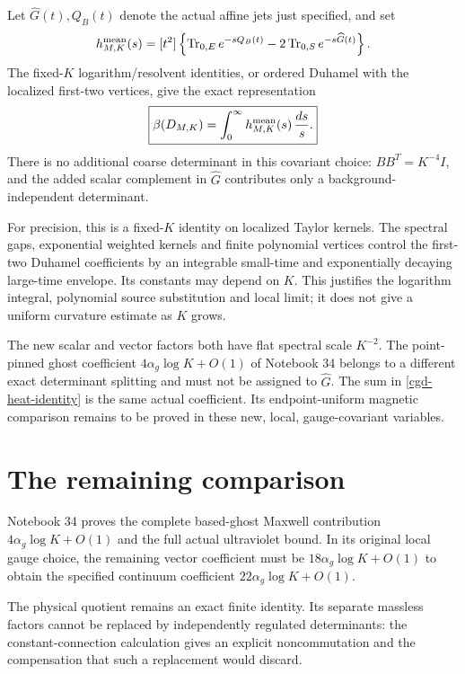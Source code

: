 \documentclass[11pt]{article}
\theoremstyle{remark}
\begin{document}
Let \(\widehat G(t),Q_B(t)\) denote the actual affine
jets just specified, and set
\begin{equation}
 h^{\rm mean}_{M,K}(s)
  =[t^2]\left\{
    \operatorname{Tr}_{0,E}e^{-sQ_B(t)}
             -2\operatorname{Tr}_{0,S}e^{-s\widehat G(t)}
         \right\}.
 \label{cgd-heat-coefficient}
\end{equation}
The fixed-\(K\) logarithm/resolvent identities, or
ordered Duhamel with the localized first-two vertices,
give the exact representation
\begin{equation}
 \boxed{\displaystyle
     \beta(D_{M,K})=
        \int_0^\infty h^{\rm mean}_{M,K}(s)\,\frac{ds}{s}.}
 \label{cgd-heat-identity}
\end{equation}
There is no additional coarse determinant in this
covariant choice: \(BB^T=K^{-4}I\), and the added
scalar complement in \(\widehat G\) contributes only
a background-independent determinant.

For precision, this is a fixed-\(K\) identity on
localized Taylor kernels. The spectral gaps,
exponential weighted kernels and finite polynomial
vertices control the first-two Duhamel coefficients
by an integrable small-time and exponentially
decaying large-time envelope. Its constants may
depend on \(K\). This justifies the logarithm
integral, polynomial source substitution and local
limit; it does not give a uniform curvature
estimate as \(K\) grows.

The new scalar and vector factors both have flat
spectral scale \(K^{-2}\). The point-pinned ghost
coefficient \(4\alpha_g\log K+O(1)\) of Notebook 34
belongs to a different exact determinant splitting
and must not be assigned to \(\widehat G\).
The sum in \eqref{cgd-heat-identity} is the same
actual coefficient. Its endpoint-uniform magnetic
comparison remains to be proved in these new,
local, gauge-covariant variables.


\section{The remaining comparison}

Notebook 34 proves the complete based-ghost Maxwell
contribution \(4\alpha_g\log K+O(1)\) and the full
actual ultraviolet bound. In its original local
gauge choice, the remaining vector coefficient
must be \(18\alpha_g\log K+O(1)\) to obtain the
specified continuum coefficient
\(22\alpha_g\log K+O(1)\).

The physical quotient remains an exact finite
identity. Its separate massless factors cannot be
replaced by independently regulated determinants:
the constant-connection calculation gives an
explicit noncommutation and the compensation
that such a replacement would discard.
\end{document}

